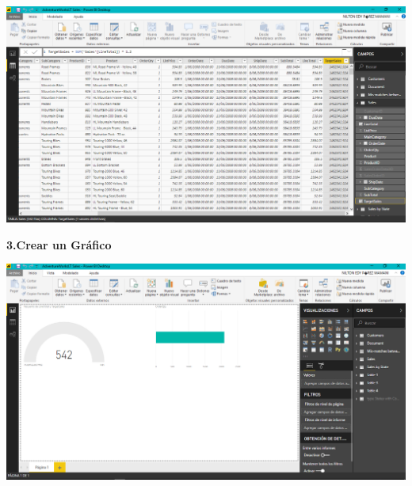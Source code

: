 \begin{center}
\includegraphics[width=15cm]{./Imagenes/imagen11}
\end{center}

\textbf{3.Crear un Gráfico}

\begin{center}
\includegraphics[width=15cm]{./Imagenes/imagen12}
\end{center}